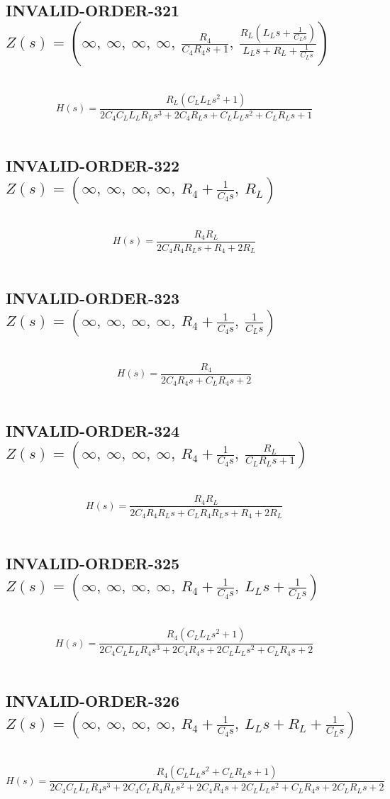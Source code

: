 \documentclass{article}
\begin{document}
\subsection{INVALID-ORDER-321 $Z(s) = \left( \infty, \  \infty, \  \infty, \  \infty, \  \frac{R_{4}}{C_{4} R_{4} s + 1}, \  \frac{R_{L} \left(L_{L} s + \frac{1}{C_{L} s}\right)}{L_{L} s + R_{L} + \frac{1}{C_{L} s}}\right)$ } \ 
\textbf{\[H(s) = \frac{R_{L} \left(C_{L} L_{L} s^{2} + 1\right)}{2 C_{4} C_{L} L_{L} R_{L} s^{3} + 2 C_{4} R_{L} s + C_{L} L_{L} s^{2} + C_{L} R_{L} s + 1}\] } \ 
\subsection{INVALID-ORDER-322 $Z(s) = \left( \infty, \  \infty, \  \infty, \  \infty, \  R_{4} + \frac{1}{C_{4} s}, \  R_{L}\right)$ } \ 
\textbf{\[H(s) = \frac{R_{4} R_{L}}{2 C_{4} R_{4} R_{L} s + R_{4} + 2 R_{L}}\] } \ 
\subsection{INVALID-ORDER-323 $Z(s) = \left( \infty, \  \infty, \  \infty, \  \infty, \  R_{4} + \frac{1}{C_{4} s}, \  \frac{1}{C_{L} s}\right)$ } \ 
\textbf{\[H(s) = \frac{R_{4}}{2 C_{4} R_{4} s + C_{L} R_{4} s + 2}\] } \ 
\subsection{INVALID-ORDER-324 $Z(s) = \left( \infty, \  \infty, \  \infty, \  \infty, \  R_{4} + \frac{1}{C_{4} s}, \  \frac{R_{L}}{C_{L} R_{L} s + 1}\right)$ } \ 
\textbf{\[H(s) = \frac{R_{4} R_{L}}{2 C_{4} R_{4} R_{L} s + C_{L} R_{4} R_{L} s + R_{4} + 2 R_{L}}\] } \ 
\subsection{INVALID-ORDER-325 $Z(s) = \left( \infty, \  \infty, \  \infty, \  \infty, \  R_{4} + \frac{1}{C_{4} s}, \  L_{L} s + \frac{1}{C_{L} s}\right)$ } \ 
\textbf{\[H(s) = \frac{R_{4} \left(C_{L} L_{L} s^{2} + 1\right)}{2 C_{4} C_{L} L_{L} R_{4} s^{3} + 2 C_{4} R_{4} s + 2 C_{L} L_{L} s^{2} + C_{L} R_{4} s + 2}\] } \ 
\subsection{INVALID-ORDER-326 $Z(s) = \left( \infty, \  \infty, \  \infty, \  \infty, \  R_{4} + \frac{1}{C_{4} s}, \  L_{L} s + R_{L} + \frac{1}{C_{L} s}\right)$ } \ 
\textbf{\[H(s) = \frac{R_{4} \left(C_{L} L_{L} s^{2} + C_{L} R_{L} s + 1\right)}{2 C_{4} C_{L} L_{L} R_{4} s^{3} + 2 C_{4} C_{L} R_{4} R_{L} s^{2} + 2 C_{4} R_{4} s + 2 C_{L} L_{L} s^{2} + C_{L} R_{4} s + 2 C_{L} R_{L} s + 2}\] } \ 
\end{document}
